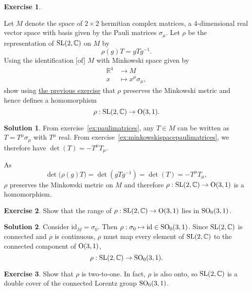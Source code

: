 \documentclass[11pt, a4paper]{report}
\theoremstyle{definition}
\newtheorem{ex}{Exercise}[part]
\newtheorem{sol}{Solution}[part]
\newcommand*{\SL}{\ensuremath\text{SL}}
\renewcommand*{\O}{\ensuremath\text{O}}
\newcommand*{\SO}{\ensuremath\text{SO}}
\begin{document}
\begin{ex}\label{ex:slrepresentation}

Let $M$ denote the space of $2 \times 2$ hermitian complex matrices, a 4-dimensional real vector space with basis given by the Pauli matrices $\sigma_\mu$.
Let $\rho$ be the representation of $\SL(2, \mathbb{C})$ on $M$ by
\[
    \rho(g) T = g T g^{-1}.
\]
Using the identification [of] $M$ with Minkowski space given by
\begin{align*}
    \mathbb{R}^4 &\to M \\
    x            &\mapsto x^\mu \sigma_\mu,
\end{align*}
show using \hyperref[ex:minkowskispacepaulimatrices]{the previous exercise} that $\rho$ preserves the Minkowski metric and hence defines a homomorphism
\[
    \rho: \SL(2, \mathbb{C}) \to \O(3, 1).
\]

\end{ex}

\begin{sol}

From exercise~\ref{ex:paulimatrices}, any $T \in M$ can be written as $T = T^\mu \sigma_\mu$ with $T^\mu$ real.
From exercise~\ref{ex:minkowskispacepaulimatrices}, we therefore have $\det(T) = -T^\mu T_\mu$.

As
\[
    \det\bigl( \rho(g) T \bigr) = \det(g T g^{-1}) = \det(T) = -T^\mu T_\mu,
\]
$\rho$ preserves the Minkowski metric on $M$ and therefore $\rho: \SL(2, \mathbb{C}) \to \O(3, 1)$ is a homomorphism.

\end{sol}

\begin{ex}

Show that the range of $\rho: \SL(2, \mathbb{C}) \to \O(3, 1)$ lies in $\SO_0(3, 1)$.

\end{ex}

\begin{sol}

Consider $\text{id}_M = \sigma_0$. Then $\rho: \sigma_0 \mapsto \text{id} \in \SO_0(3, 1)$.
Since $\SL(2, \mathbb{C})$ is connected and $\rho$ is continuous, $\rho$ must map every element of $\SL(2, \mathbb{C})$ to the connected component of $\O(3, 1)$,
\[
    \rho: \SL(2, \mathbb{C}) \to \SO_0(3, 1).
\]

\end{sol}

\begin{ex}

Show that $\rho$ is two-to-one. In fact, $\rho$ is also onto, so $\SL(2, \mathbb{C})$ is a double cover of the connected Lorentz group $\SO_0(3, 1)$.

\end{ex}
\end{document}
